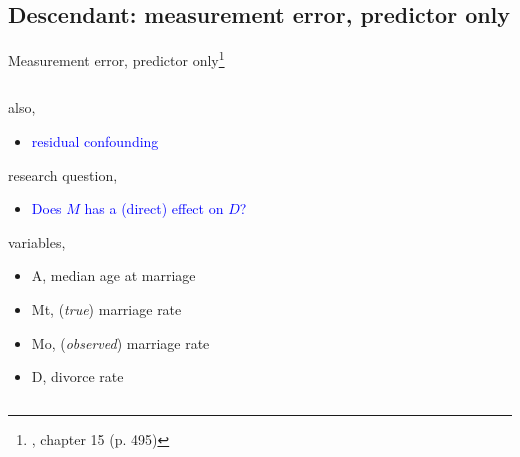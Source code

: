 \subsection{Descendant: measurement error, predictor only}
%
%
\begin{frame}[t, negative]
	\subsectionpage
\end{frame}
%
%
\begin{frame}
	{Measurement error, predictor only\footnote{\citet{McElreath_2020}, chapter 15 (p. 495)}}
	\begin{columns}
		\begin{column}{0.5\textwidth}
			also, 
			\begin{itemize}
				\item \textcolor{blue}{residual confounding}
			\end{itemize}
			
			research question, 
			\begin{itemize}
				\item \textcolor{blue}{Does $M$ has a (direct) effect on $D$?}
			\end{itemize}
			
			variables,
			\begin{itemize}
				\item A, median age at marriage
				\item Mt, (\textit{true}) marriage rate 
				\item Mo, (\textit{observed}) marriage rate
				\item D, divorce rate 
			\end{itemize}
			

\end{column}
\end{columns}
\end{frame}
